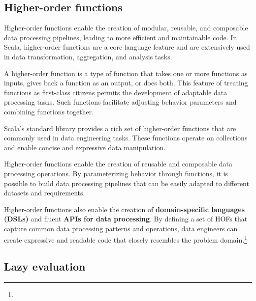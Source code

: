 \subsection{Higher-order functions}

Higher-order functions enable the creation of modular, reusable, and composable data processing pipelines, leading to more efficient and maintainable code. In Scala, higher-order functions are a core language feature and are extensively used in data transformation, aggregation, and analysis tasks.\footnotemark {}

A higher-order function is a type of function that takes one or more functions as inputs, gives back a function as an output, or does both. This feature of treating functions as first-class citizens permits the development of adaptable data processing tasks. Such functions facilitate adjusting behavior parameters and combining functions together.\footnotemark[10]

Scala's standard library provides a rich set of higher-order functions that are commonly used in data engineering tasks. These functions operate on collections and enable concise and expressive data manipulation.\footnotemark[10]









Higher-order functions enable the creation of reusable and composable data processing operations. By parameterizing behavior through functions, it is possible to build data processing pipelines that can be easily adapted to different datasets and requirements.\footnotemark[10]

Higher-order functions also enable the creation of \textbf{domain-specific languages (DSLs)} and fluent \textbf{APIs for data processing}. By defining a set of HOFs that capture common data processing patterns and operations, data engineers can create expressive and readable code that closely resembles the problem domain.\footnote[10]{}





\subsection{Lazy evaluation}

